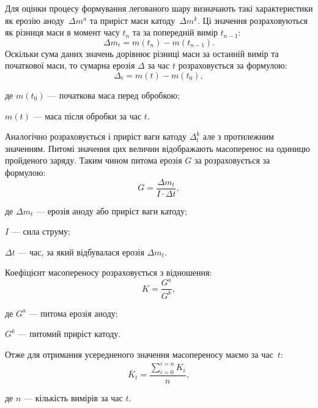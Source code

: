 \documentclass[a4paper,fontsize=14bp,ukrainian]{extreport}
\begin{document}
Для оцінки процесу формування легованого шару визначають такі характеристики як ерозію аноду~$\Delta m^a$ та приріст маси катоду~$\Delta m^k$. Ці значення розраховуються як різниця маси в момент часу $t_{n}$ та за попередній вимір $t_{n-1}$:
\begin{equation}
\Delta m_t  = m(t_n)-m(t_{n-1}).
\label{eq:deltam}
\end{equation}
Оскільки сума даних значень дорівнює різниці маси за останній вимір та початкової маси, то сумарна ерозія $\Delta$ за час $t$ розраховується за формулою:
\begin{equation}
\Delta_t = m(t)-m(t_0),
\label{eq:erosion}
\end{equation}
\begin{eqitemize}
\item[де] $m(t_0)$ --- початкова маса перед обробкою;
\item $m(t)$ --- маса після обробки за час $t$.
\end{eqitemize}

Аналогічно розраховується і приріст ваги катоду $\Delta_t^k$  але з протилежним значенням. Питомі значення цих величин відображають масоперенос на одиницю пройденого заряду. Таким чином питома ерозія $G$ за  розраховується за формулою:
\begin{equation}
G = \frac{\Delta m_t}{I \cdot \Delta t},
\label{eq:specific_erosion}
\end{equation}
\begin{eqitemize}
\item[де] $\Delta m_t$ --- ерозія аноду або приріст ваги катоду;
\item $I$ --- сила струму;
\item $\Delta t$ --- час, за який відбувалася ерозія $\Delta m_t$.
\end{eqitemize}

Коефіцієнт масопереносу розраховується з відношення:
\begin{equation}
K = \frac{G^a}{G^k},
\label{eq:masstransfer_coef}
\end{equation}
\begin{eqitemize}
\item[де] $G^a$ --- питома ерозія аноду;
\item $G^k$ --- питомий приріст катоду.
\end{eqitemize}

Отже для отримання усередненого значення масопереносу маємо за час~$t$:
\begin{equation}
\bar{K}_t = \frac{\sum_{i=0}^{i=n} K_i}{n},
\label{eq:average_masstransfer_coef}
\end{equation}
\begin{eqitemize}
\item[де] $n$ --- кількість вимірів за час $t$.
\end{eqitemize}
\end{document}

